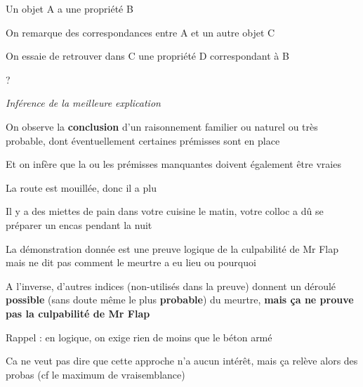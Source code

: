 \begin{frame}
	
		\begin{description}[labelindent=6pt,style=multiline,leftmargin=1.3in]
		 \setlength\itemsep{1em}
		 \item[En gros] Un objet A a une propriété B\pause
		 \item[] On remarque des correspondances entre A et un autre objet C\pause
		 \item[] On essaie de retrouver dans C une propriété D correspondant à B\pause
		 \item[Exemple] ?
  	\end{description}
\end{frame}


\begin{frame}
	
		\begin{description}[labelindent=6pt,style=multiline,leftmargin=1.3in]
		 \setlength\itemsep{1em}
		 \item[ou] \textit{Inférence de la meilleure explication}\pause
		 \item[En gros] On observe la \textbf{conclusion} d'un raisonnement familier ou naturel ou très probable, dont éventuellement certaines prémisses sont en place\pause
		 \item[] Et on infère que la ou les prémisses manquantes doivent également être vraies\pause
		 \item[Exemples] La route est mouillée\pause, donc il a plu\pause
		 \item[] Il y a des miettes de pain dans votre cuisine le matin\pause, votre colloc a dû se préparer un encas pendant la nuit
  	\end{description}
\end{frame}



\begin{frame}

La démonstration donnée est une preuve logique de la culpabilité de Mr Flap \pause mais ne dit pas comment le meurtre a eu lieu ou pourquoi\pause\newline

A l'inverse, d'autres indices (non-utilisés dans la preuve) donnent un déroulé \textbf{possible} (sans doute même le plus \textbf{probable}) du meurtre\pause, \textbf{mais ça ne prouve pas la culpabilité de Mr Flap}\newline\pause
	
Rappel : en logique, on exige rien de moins que le béton armé\pause\newline 

Ca ne veut pas dire que cette approche n'a aucun intérêt, mais ça relève alors des probas (cf le maximum de vraisemblance)
\end{frame}



